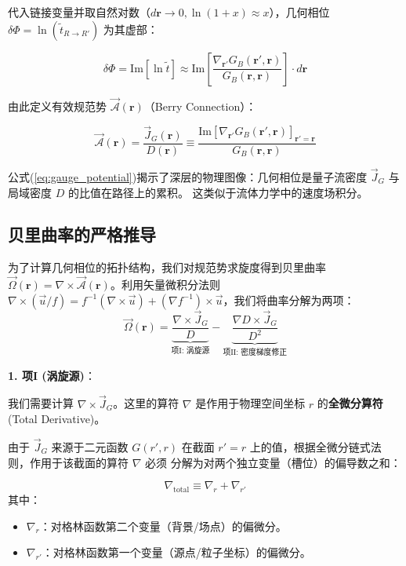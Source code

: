 \documentclass[a4paper,12pt]{article}
\begin{document}
代入链接变量并取自然对数（$d\mathbf{r} \to 0, \ln(1+x) \approx x$），几何相位 $\delta \Phi = \ln(\tilde{t}_{R \rightarrow R'})$ 为其虚部：

\begin{equation}
    \delta \Phi = \text{Im}[\ln \tilde{t}] \approx \text{Im}\left[ \frac{\nabla_{\mathbf{r}'} G_B(\mathbf{r}', \mathbf{r})}{G_B(\mathbf{r}, \mathbf{r})} \right] \cdot d\mathbf{r}
\end{equation}

由此定义有效规范势 $\vec{\mathcal{A}}(\mathbf{r})$（Berry Connection）：

\begin{equation}
    \vec{\mathcal{A}}(\mathbf{r}) = \frac{\vec{J}_G(\mathbf{r})}{D(\mathbf{r})} \equiv \frac{\text{Im}[\nabla_{\mathbf{r}'} G_B(\mathbf{r}', \mathbf{r})]_{\mathbf{r}'=\mathbf{r}}}{G_B(\mathbf{r}, \mathbf{r})}
    \label{eq:gauge_potential}
\end{equation}

公式(\ref{eq:gauge_potential})揭示了深层的物理图像：几何相位是量子流密度 $\vec{J}_G$ 与局域密度 $D$ 的比值在路径上的累积。
这类似于流体力学中的速度场积分。


\subsection{贝里曲率的严格推导}

为了计算几何相位的拓扑结构，我们对规范势求旋度得到贝里曲率 
$\vec{\Omega}(\mathbf{r}) = \nabla \times \vec{\mathcal{A}}(\mathbf{r})$。利用矢量微积分法则 $\nabla \times (\vec{u}/f) = f^{-1}(\nabla \times \vec{u}) + (\nabla f^{-1}) \times \vec{u}$，我们将曲率分解为两项：
\begin{equation}
    \vec{\Omega}(\mathbf{r}) = \underbrace{\frac{\nabla \times \vec{J}_G}{D}}_{\text{项I: 涡旋源}} - \underbrace{\frac{\nabla D \times \vec{J}_G}{D^2}}_{\text{项II: 密度梯度修正}}
\end{equation}

\textbf{1. 项I (涡旋源)}：

我们需要计算 $\nabla \times \vec{J}_G$。这里的算符 $\nabla$ 是作用于物理空间坐标 $r$ 的\textbf{全微分算符} (Total Derivative)。

由于 $\vec{J}_G$ 来源于二元函数 $G(r', r)$ 在截面 $r'=r$ 上的值，根据全微分链式法则，作用于该截面的算符 $\nabla$ 必须
分解为对两个独立变量（槽位）的偏导数之和：

\begin{equation}
    \nabla_{\text{total}} \equiv \nabla_r + \nabla_{r'}
\end{equation}
其中：
\begin{itemize}
    \item $\nabla_r$：对格林函数第二个变量（背景/场点）的偏微分。
    \item $\nabla_{r'}$：对格林函数第一个变量（源点/粒子坐标）的偏微分。
\end{itemize}
\end{document}
